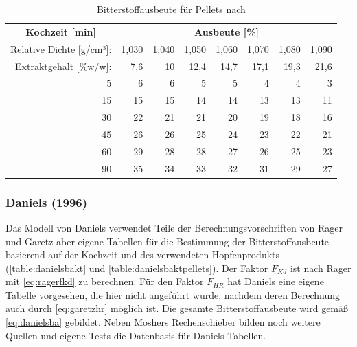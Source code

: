 \documentclass[a4paper,parskip=half]{scrartcl}
\newcommand{\FKd}{F_{\mathit{Kd}}}
\newcommand{\FHR}{F_{\mathit{HR}}}
\begin{document}
\begin{table}[H]
\centering
\begin{tabular}{rrrrrrrr} 
\toprule
\multicolumn{1}{c}{\textbf{Kochzeit [min]}} & \multicolumn{7}{c}{\textbf{Ausbeute [\%]}}  \\
Relative Dichte [g/cm³]:                                        & 1,030 & 1,040 & 1,050 & 1,060 & 1,070 & 1,080  & 1,090                   \\
Extraktgehalt [\%w/w]:                                            & 7,6 & 10 & 12,4 & 14,7 & 17,1 & 19,3  & 21,6                   \\  
\midrule
5                                            & 6     & 6     & 5     & 5     & 4     & 4      & 3                          \\
15                                           & 15    & 15    & 14    & 14    & 13    & 13     & 11                         \\
30                                           & 22    & 21    & 21    & 20    & 19    & 18     & 16                         \\
45                                           & 26    & 26    & 25    & 24    & 23    & 22     & 21                         \\
60                                           & 29    & 28    & 28    & 27    & 26    & 25     & 23                         \\
90                                           & 35    & 34    & 33    & 32    & 31    & 29     & 27                         \\
\bottomrule
\end{tabular}
\caption{Bitterstoffausbeute für Pellets nach \citeauthor{Mosher1994} \parencite[51]{Holle2010}}
\label{table:mosherbaktpellets}
\end{table}

\subsubsection*{Daniels (1996)}

Das Modell von Daniels verwendet Teile der Berechnungsvorschriften
von Rager und Garetz aber eigene Tabellen für die Bestimmung
der Bitterstoffausbeute basierend auf der Kochzeit und des
verwendeten Hopfenprodukts (\autoref{table:danielsbakt} und \autoref{table:danielsbaktpellets}).
Der Faktor $\FKd$ ist nach Rager mit \autoref{eq:ragerfkd} zu berechnen.
Für den Faktor $\FHR$ hat Daniels eine eigene Tabelle vorgesehen,
die hier nicht angeführt wurde, nachdem deren Berechnung auch durch
\autoref{eq:garetzhr} möglich ist.
Die gesamte Bitterstoffausbeute wird gemäß \autoref{eq:danielsba} gebildet.
Neben Moshers Rechenschieber bilden noch weitere Quellen und eigene
Tests die Datenbasis für Daniels Tabellen. \parencite[80,85-88]{Daniels1996}
\end{document}
